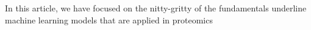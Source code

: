 In this article, we have focused on the nitty-gritty of the fundamentals underline machine learning models that are applied in proteomics
